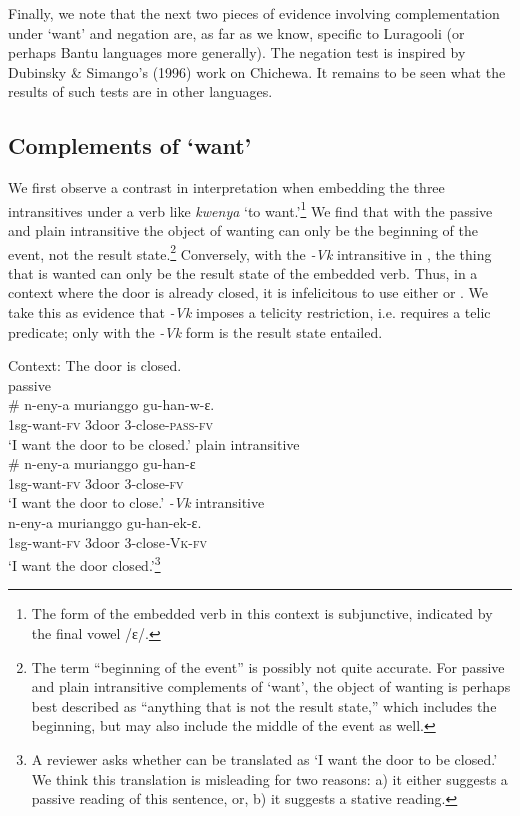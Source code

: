 \documentclass[output=paper]{langsci/langscibook}
\begin{document}
Finally, we note that the next two pieces of evidence involving complementation under ‘want’ and negation are, as far as we know, specific to Luragooli (or perhaps Bantu languages more generally). The negation test is inspired by Dubinsky \& Simango’s (1996) work on Chichewa. It remains to be seen what the results of such tests are in other languages. 

\subsection{Complements of ‘want’}

We first observe a contrast in interpretation when embedding the three intransitives under a verb like \textit{kwenya} ‘to want.’\footnote{The form of the embedded verb in this context is subjunctive, indicated by the final vowel /ɛ/.} We find that with the passive  and plain intransitive  the object of wanting can only be the beginning of the event, not the result state.\footnote{The term “beginning of the event” is possibly not quite accurate. For passive and plain intransitive complements of ‘want’, the object of wanting is perhaps best described as “anything that is not the result state,” which includes the beginning, but may also include the middle of the event as well.}  Conversely, with the \textit{-Vk} intransitive in , the thing that is wanted can only be the result state of the embedded verb. Thus, in a context where the door is already closed, it is infelicitous to use either  or . We take this as evidence that \textit{-Vk} imposes a telicity restriction, i.e. requires a telic predicate; only with the \textit{-Vk} form is the result state entailed.

\ea\label{ex:gluckman:12} 
{Context: The door is closed.}\\
  \ea\label{ex:gluckman:12a}
  {{passive}}\\
  \gll   \# n-eny-a       murianggo gu-han-w-ɛ.\\
      {}  1sg-want-\textsc{fv} 3door         3-close-\textsc{pass}-\textsc{fv}\\
  \glt ‘I want the door to be closed.’
  \ex\label{ex:gluckman:12b}
  {  {plain intransitive}}\\
  \gll   \# n-eny-a       murianggo gu-han-ɛ\\
      {}  1sg-want-\textsc{fv} 3door        3-close-\textsc{fv}\\
  \glt ‘I want the door to close.’
  \ex\label{ex:gluckman:12c}
  {{\textit{-Vk}} {intransitive}}\\
  \gll   n-eny-a         murianggo gu-han-ek-ɛ.\\
	1sg-want-\textsc{fv} 3door        3-close\textit{-}\textsc{Vk}-\textsc{fv}\\
  \glt ‘I want the door closed.’\footnote{A reviewer asks whether  can be translated as ‘I want the door to be closed.’ We think this translation is misleading for two reasons: a) it either suggests a passive reading of this sentence, or, b) it suggests a stative reading.}
  \z
\z
\end{document}
